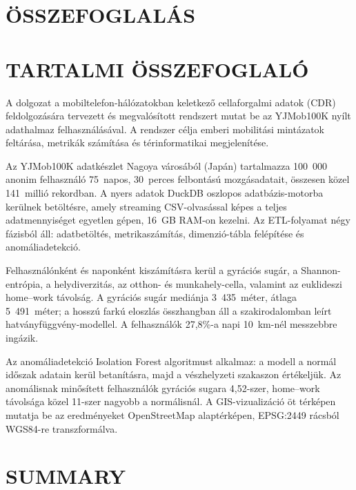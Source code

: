 \clearpage
\section{ÖSSZEFOGLALÁS}



\clearpage
\section*{TARTALMI ÖSSZEFOGLALÓ}

A dolgozat a mobiltelefon-hálózatokban keletkező cellaforgalmi adatok (CDR) feldolgozására tervezett és megvalósított rendszert mutat be az YJMob100K nyílt adathalmaz felhasználásával. A rendszer célja emberi mobilitási mintázatok feltárása, metrikák számítása és térinformatikai megjelenítése.

Az YJMob100K adatkészlet Nagoya városából (Japán) tartalmazza 100~000 anonim felhasználó 75~napos, 30~perces felbontású mozgásadatait, összesen közel 141~millió rekordban. A nyers adatok DuckDB oszlopos adatbázis-motorba kerülnek betöltésre, amely streaming CSV-olvasással képes a teljes adatmennyiséget egyetlen gépen, 16~GB RAM-on kezelni. Az ETL-folyamat négy fázisból áll: adatbetöltés, metrikaszámítás, dimenzió-tábla felépítése és anomáliadetekció.

Felhasználónként és naponként kiszámításra kerül a gyrációs sugár, a Shannon-entrópia, a helydiverzitás, az otthon- és munkahely-cella, valamint az euklideszi home--work távolság. A gyrációs sugár mediánja 3~435~méter, átlaga 5~491~méter; a hosszú farkú eloszlás összhangban áll a szakirodalomban leírt hatványfüggvény-modellel. A felhasználók 27{,}8\%-a napi 10~km-nél messzebbre ingázik.

Az anomáliadetekció Isolation Forest algoritmust alkalmaz: a modell a normál időszak adatain kerül betanításra, majd a vészhelyzeti szakaszon értékeljük. Az anomálisnak minősített felhasználók gyrációs sugara 4{,}52-szer, home--work távolsága közel 11-szer nagyobb a normálisnál. A GIS-vizualizáció öt térképen mutatja be az eredményeket OpenStreetMap alaptérképen, EPSG:2449 rácsból WGS84-re transzformálva.

\clearpage
\section*{SUMMARY}


